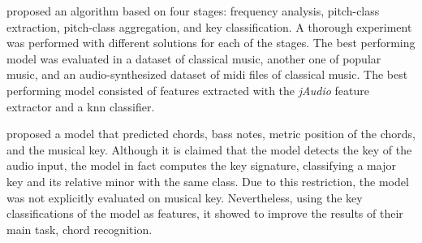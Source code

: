 



\textcite{campbell2010automatic} proposed an algorithm based
on four stages: frequency analysis, pitch-class extraction,
pitch-class aggregation, and key classification. A thorough
experiment was performed with different solutions for each
of the stages. The best performing model was evaluated in a
dataset of classical music, another one of popular music,
and an audio-synthesized dataset of \gls{midi} files of
classical music. The best performing model consisted of
features extracted with the \emph{jAudio} feature extractor
\parencite{mcennis2005jaudio} and a \gls{knn} classifier.

\textcite{mauch2010simultaneous} proposed a model that
predicted chords, bass notes, metric position of the chords,
and the musical key. Although it is claimed that the model
detects the key of the audio input, the model in fact
computes the key signature, classifying a major key and its
relative minor with the same class. Due to this restriction,
the model was not explicitly evaluated on musical key.
Nevertheless, using the key classifications of the model as
features, it showed to improve the results of their main
task, chord recognition.









